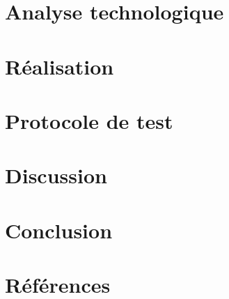 \documentclass[a4paper, 12pt]{article}
\begin{document}
\section{Analyse technologique} %

\newpage

\section{Réalisation} %

\newpage

\section{Protocole de test} %

\newpage

\section{Discussion} %

\newpage

\section{Conclusion} %

\newpage

\section{Références} %


\end{document}
